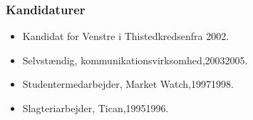\documentclass[11pt, a4paper]{awesome-cv}
\begin{document}
\begin{cvletter}
\subsubsection*{Kandidaturer}
\begin{itemize}
\item Kandidat for Venstre i Thistedkredsenfra 2002.
\end{itemize}
\begin{itemize}
\item Selvstændig, kommunikationsvirksomhed,20032005.
\item Studentermedarbejder, Market Watch,19971998.
\item Slagteriarbejder, Tican,19951996.
\end{itemize}
\end{cvletter}
\end{document}
